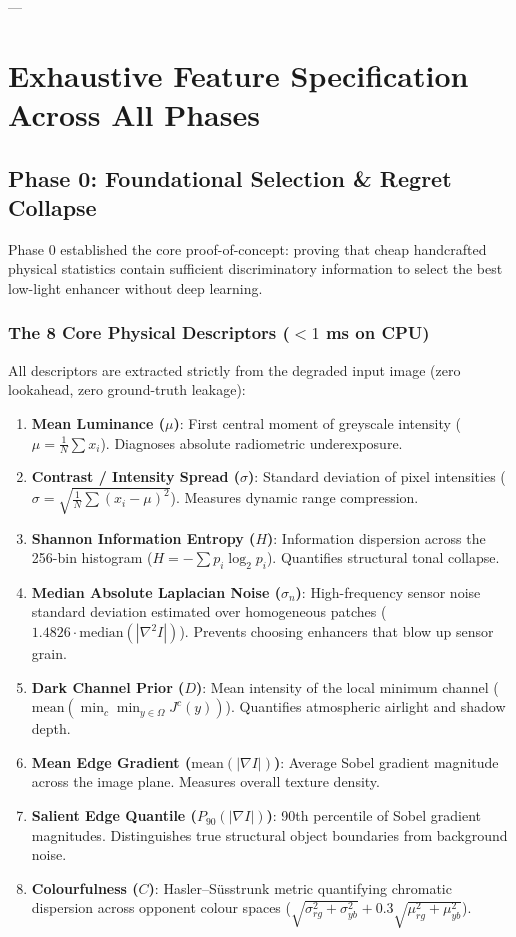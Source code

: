 \documentclass[10pt,a4paper]{article}
\begin{document}
---

\section{Exhaustive Feature Specification Across All Phases}

\subsection{Phase 0: Foundational Selection \& Regret Collapse}
Phase 0 established the core proof-of-concept: proving that cheap handcrafted physical statistics contain sufficient discriminatory information to select the best low-light enhancer without deep learning.

\subsubsection{The 8 Core Physical Descriptors ($<1$ ms on CPU)}
All descriptors are extracted strictly from the degraded input image (zero lookahead, zero ground-truth leakage):
\begin{enumerate}[leftmargin=*]
    \item \textbf{Mean Luminance ($\mu$)}: First central moment of greyscale intensity ($\mu = \frac{1}{N}\sum x_i$). Diagnoses absolute radiometric underexposure.
    \item \textbf{Contrast / Intensity Spread ($\sigma$)}: Standard deviation of pixel intensities ($\sigma = \sqrt{\frac{1}{N}\sum (x_i - \mu)^2}$). Measures dynamic range compression.
    \item \textbf{Shannon Information Entropy ($H$)}: Information dispersion across the 256-bin histogram ($H = -\sum p_i \log_2 p_i$). Quantifies structural tonal collapse.
    \item \textbf{Median Absolute Laplacian Noise ($\sigma_n$)}: High-frequency sensor noise standard deviation estimated over homogeneous patches ($1.4826 \cdot \text{median}(|\nabla^2 I|)$). Prevents choosing enhancers that blow up sensor grain.
    \item \textbf{Dark Channel Prior ($D$)}: Mean intensity of the local minimum channel ($\mathrm{mean}(\min_{c} \min_{y \in \Omega} J^c(y))$). Quantifies atmospheric airlight and shadow depth.
    \item \textbf{Mean Edge Gradient ($\mathrm{mean}(|\nabla I|)$)}: Average Sobel gradient magnitude across the image plane. Measures overall texture density.
    \item \textbf{Salient Edge Quantile ($P_{90}(|\nabla I|)$)}: 90th percentile of Sobel gradient magnitudes. Distinguishes true structural object boundaries from background noise.
    \item \textbf{Colourfulness ($C$)}: Hasler--S\"usstrunk metric quantifying chromatic dispersion across opponent colour spaces ($\sqrt{\sigma_{rg}^2 + \sigma_{yb}^2} + 0.3\sqrt{\mu_{rg}^2 + \mu_{yb}^2}$).
\end{enumerate}
\end{document}
